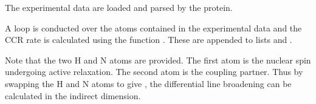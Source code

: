 \documentclass[a4paper,10pt,english,openany,oneside]{sphinxmanual}
\begin{document}
The experimental data are loaded and parsed by the protein.

%
\begin{sphinxVerbatim}[commandchars=\\\{\}]
  
  
\end{sphinxVerbatim}

A loop is conducted over the atoms contained in the experimental data and the CCR rate is calculated using the function {\hyperref[\detokenize{reference/generated/paramagpy.metal.Metal.atom_ccr:paramagpy.metal.Metal.atom_ccr}]{}}. These are appended to lists  and .

Note that the two H and N atoms are provided. The first atom is the nuclear spin undergoing active relaxation. The second atom is the coupling partner. Thus by swapping the H and N atoms to give , the differential line broadening can be calculated in the indirect dimension.
\end{document}
